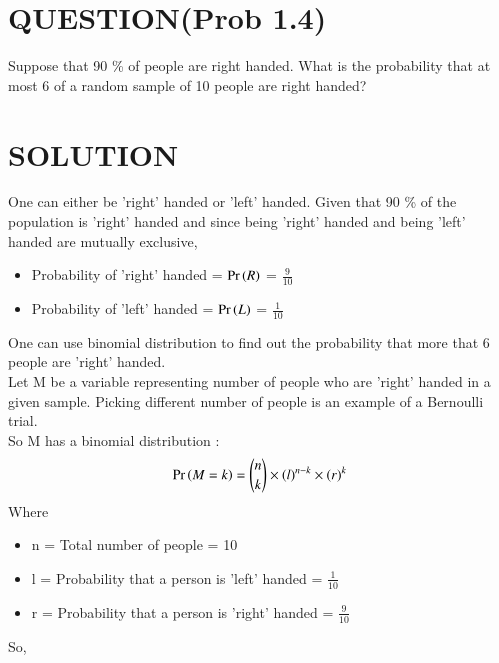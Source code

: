 \documentclass[journal,12pt,twocolumn]{IEEEtran}
\begin{document}
\section*{QUESTION(Prob 1.4)}
Suppose that 90 \% of people are right handed. 
What is the probability that at most 6 of a random sample 
of 10 people are right handed?\\
\section*{SOLUTION}
One can either be 'right' handed or 'left' handed. Given that 90 \% of the population is 'right' handed and since being 'right' handed and being 'left' handed are mutually exclusive,
\bigskip
\begin{itemize}
\item Probability of 'right' handed = $\Pr\left(R\right)$ = \(\frac{9}{10}\)
\item Probability of 'left' handed = $\Pr\left(L\right)$ = \( \frac{1}{10} \)
\end{itemize}
\bigskip
One can use binomial distribution to find out the probability that more that 6 people are 'right' handed.\\
Let M be a variable representing number of people who are 'right' handed in a given sample. Picking different number of people is an example of a Bernoulli trial.\\
So M has a binomial distribution : 
\begin{align}
\Pr\left(M=k\right) = {{n}\choose{k}} \times (l)^{n-k} \times (r)^{k}\label{0.0.1}
\end{align}
Where
\begin{itemize}
    \item n = Total number of people = 10 
    \item l = Probability that a person is 'left' handed = \( \frac{1}{10} \)
    \item r = Probability that a person is 'right' handed = \( \frac{9}{10} \)
\end{itemize}
\bigskip
So,
\end{document}
